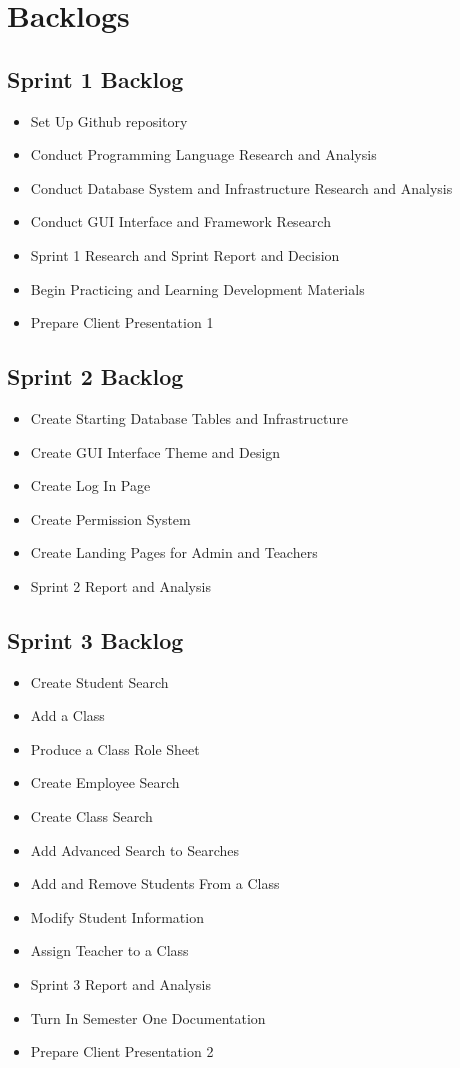 \section{Backlogs}
\subsection{Sprint 1 Backlog}
\begin{itemize}
\item Set Up Github repository
\item Conduct Programming Language Research and Analysis
\item Conduct Database System and Infrastructure Research and Analysis
\item Conduct GUI Interface and Framework Research 
\item Sprint 1 Research and Sprint Report and Decision
\item Begin Practicing and Learning Development Materials
\item Prepare Client Presentation 1
\end{itemize}

\subsection{Sprint 2 Backlog}
\begin{itemize}
\item Create Starting Database Tables and Infrastructure
\item Create GUI Interface Theme and Design
\item Create Log In Page 
\item Create Permission System 
\item Create Landing Pages for Admin and Teachers
\item Sprint 2 Report and Analysis  
\end{itemize}

\subsection{Sprint 3 Backlog}
\begin{itemize}
\item Create Student Search
\item Add a Class
\item Produce a Class Role Sheet
\item Create Employee Search
\item Create Class Search
\item Add Advanced Search to Searches
\item Add and Remove Students From a Class 
\item Modify Student Information
\item Assign Teacher to a Class
\item Sprint 3 Report and Analysis
\item Turn In Semester One Documentation
\item Prepare Client Presentation 2  
\end{itemize}

